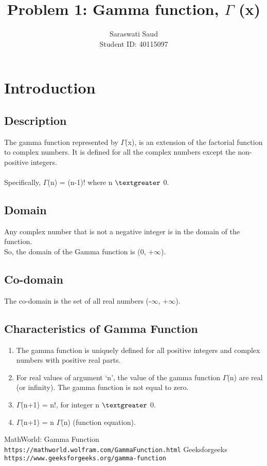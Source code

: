 \documentclass[a4paper,12pt]{article}
\title{Problem 1: Gamma function, $\Gamma$ (x)}
\author{Saraswati Saud \\
Student ID: 40115097}
\date{}
\begin{document}
\maketitle
\section{Introduction}
    \subsection{Description}
    The gamma function represented by $\Gamma$(x), is an extension of the factorial function to complex numbers. It is defined for all the complex numbers except the non-positive integers.\\ \\
    Specifically, $\Gamma$(n) = (n-1)! where n $\textgreater$ 0.

    \subsection{Domain}
    Any complex number that is not a negative integer is in the domain of the function.\\
    So, the domain of the Gamma function is (0, +$\infty$).
    
    \subsection{Co-domain}
    The co-domain is the set of all real numbers (-$\infty$, +$\infty$).
    
    \subsection{Characteristics of Gamma Function}
    \begin{enumerate}
        \item The gamma function is uniquely defined for all positive integers and complex numbers with positive real parts.
        \item For real values of argument ‘n’, the value of the gamma function $\Gamma$(n) are real (or infinity). The gamma function is not equal to zero.
        \item $\Gamma$(n+1) = n!, for integer n $\textgreater$ 0.
        \item $\Gamma$(n+1) = n $\Gamma$(n) (function equation).
    \end{enumerate}
    
    \begin{thebibliography}{}
        \bibitem{}
        MathWorld: Gamma Function
        \\\texttt{https://mathworld.wolfram.com/GammaFunction.html}
        \bibitem{}
        Geeksforgeeks
        \\\texttt{https://www.geeksforgeeks.org/gamma-function}
    \end{thebibliography}
\end{document}
